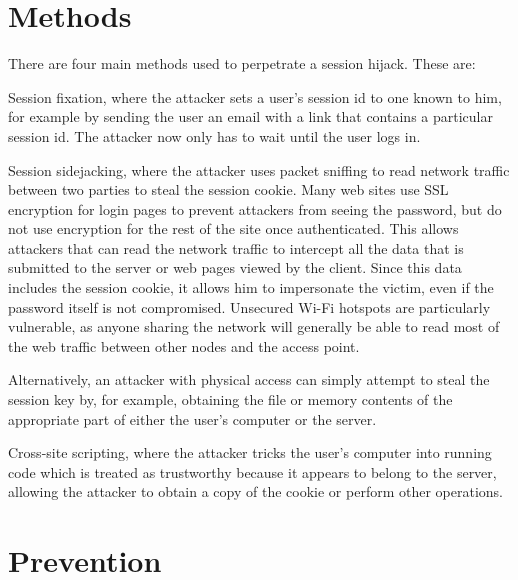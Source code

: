 \section{Methods}


There are four main methods used to perpetrate a session hijack. These are:

\begin{compactitem}
\item Session fixation, where the attacker sets a user's session id to one known to him, for example by sending the user an email with a link that contains a particular session id. The attacker now only has to wait until the user logs in.

\item Session sidejacking, where the attacker uses packet sniffing to read network traffic between two parties to steal the session cookie. Many web sites use SSL encryption for login pages to prevent attackers from seeing the password, but do not use encryption for the rest of the site once authenticated. This allows attackers that can read the network traffic to intercept all the data that is submitted to the server or web pages viewed by the client. Since this data includes the session cookie, it allows him to impersonate the victim, even if the password itself is not compromised. Unsecured Wi-Fi hotspots are particularly vulnerable, as anyone sharing the network will generally be able to read most of the web traffic between other nodes and the access point.

Alternatively, an attacker with physical access can simply attempt to steal the session key by, for example, obtaining the file or memory contents of the appropriate part of either the user's computer or the server.

\item Cross-site scripting, where the attacker tricks the user's computer into running code which is treated as trustworthy because it appears to belong to the server, allowing the attacker to obtain a copy of the cookie or perform other operations.

\end{compactitem}









\section{Prevention}


